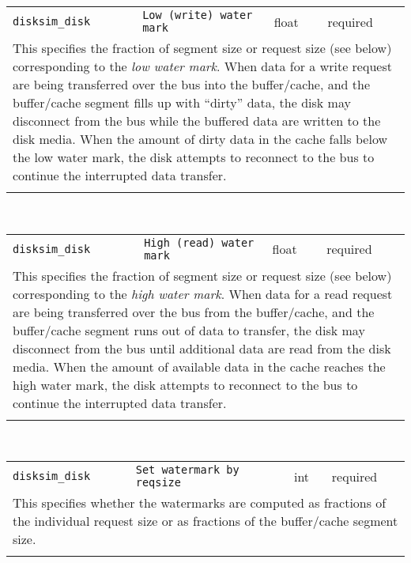 \begin{tabular}{|p{1.5in}|p{3.5in}|p{0.5in}|p{0.5in}|}
\cline{1-4}
\texttt{disksim\_disk} & \texttt{Low (write) water mark} & float & required \\ 
\cline{1-4}
\multicolumn{4}{|p{6in}|}{
This specifies the fraction of segment size or request size (see below)
corresponding to the {\it low water mark}. When data for a write
request are being transferred over the bus into the buffer/cache, and
the buffer/cache segment fills up with ``dirty'' data, the disk may
disconnect from the bus while the buffered data are written to the
disk media. When the amount of dirty data in the cache falls below
the low water mark, the disk attempts to reconnect to the bus to
continue the interrupted data transfer.
}\\ 
\cline{1-4}
\multicolumn{4}{p{5in}}{}\\
\end{tabular}\\ 
\noindent 
\begin{tabular}{|p{1.5in}|p{3.5in}|p{0.5in}|p{0.5in}|}
\cline{1-4}
\texttt{disksim\_disk} & \texttt{High (read) water mark} & float & required \\ 
\cline{1-4}
\multicolumn{4}{|p{6in}|}{
This specifies the fraction of
segment size or request size (see below) corresponding to the
{\it high water mark}. When data for a read request are being transferred
over the bus from the buffer/cache, and the buffer/cache segment runs out of
data to transfer, the disk may disconnect from the bus until additional data
are read from the disk media. When the amount of available data in the cache
reaches the high water mark, the disk attempts to reconnect to the bus to
continue the interrupted data transfer.
}\\ 
\cline{1-4}
\multicolumn{4}{p{5in}}{}\\
\end{tabular}\\ 
\noindent 
\begin{tabular}{|p{1.5in}|p{3.5in}|p{0.5in}|p{0.5in}|}
\cline{1-4}
\texttt{disksim\_disk} & \texttt{Set watermark by reqsize} & int & required \\ 
\cline{1-4}
\multicolumn{4}{|p{6in}|}{
This specifies whether the
watermarks are computed as fractions of the individual request size
or as fractions of the buffer/cache segment size.
}\\ 
\cline{1-4}
\multicolumn{4}{p{5in}}{}\\
\end{tabular}\\ 
